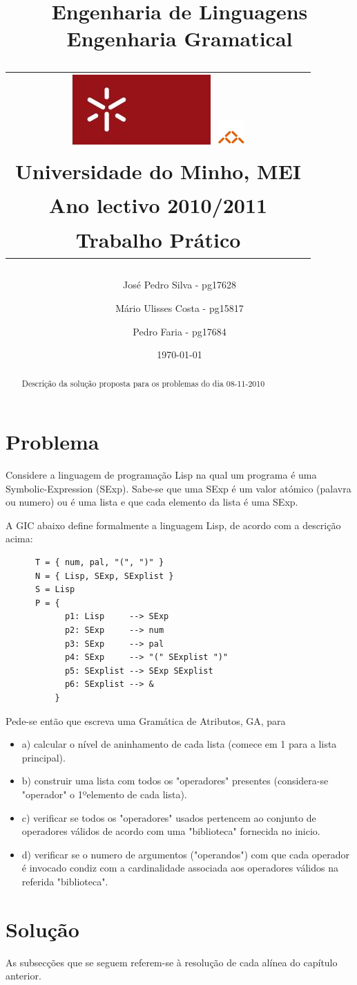 \documentclass[11pt,a4paper]{article}
\title{\sf  Engenharia de Linguagens \\ Engenharia Gramatical \\
\begin{tabular}{c}
    \includegraphics[width=.1\textwidth]{stuff/uminho.jpg}
    \includegraphics[width=.07\textwidth]{stuff/informatica.jpg}\\
    {\small Universidade do Minho}, {\small MEI}\\
    {\small Ano lectivo 2010/2011}\\
    {\small Trabalho Prático}\\
\end{tabular}
}
\author{
    {\small José Pedro Silva - pg17628} \and
    {\small Mário Ulisses Costa - pg15817} \and
    {\small Pedro Faria - pg17684}}
\date{{\small \today}}
\begin{document}
\maketitle

\begin{abstract}
Descrição da solução proposta para os problemas do dia 08-11-2010
\end{abstract}

\tableofcontents

\newpage
\section{Problema}

Considere a linguagem de programação Lisp na qual um programa é uma Symbolic-Expression (SExp). Sabe-se que uma SExp é um valor atómico (palavra ou numero) ou é uma lista e que cada elemento da lista é uma SExp.

A GIC abaixo define formalmente a linguagem Lisp, de acordo com a descrição acima: 

\begin{verbatim}
      T = { num, pal, "(", ")" }
      N = { Lisp, SExp, SExplist }
      S = Lisp
      P = {
            p1: Lisp     --> SExp
            p2: SExp     --> num
            p3: SExp     --> pal
            p4: SExp     --> "(" SExplist ")"
            p5: SExplist --> SExp SExplist
            p6: SExplist --> &
          }
\end{verbatim}

Pede-se então que escreva uma Gramática de Atributos, GA, para

\begin{itemize}
  \item a) calcular o nível de aninhamento de cada lista (comece em 1 para a lista principal).
  \item b) construir uma lista com todos os "operadores" presentes (considera-se "operador" o 1ºelemento de cada lista).
  \item c) verificar se todos os "operadores" usados pertencem ao conjunto de operadores válidos de acordo com uma "biblioteca" fornecida no inicio.
  \item d) verificar se o numero de argumentos ("operandos") com que cada operador é invocado condiz com a cardinalidade associada aos operadores válidos na referida "biblioteca".
\end{itemize}
\newpage
\section{Solução}
As subsecções que se seguem referem-se à resolução de cada alínea do capítulo anterior.
\end{document}
